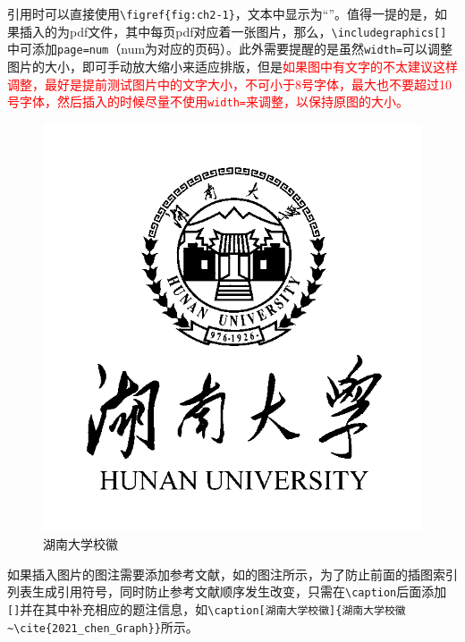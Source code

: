 引用时可以直接使用\lstinline!\figref{fig:ch2-1}!，文本中显示为“”。值得一提的是，如果插入的为pdf文件，其中每页pdf对应着一张图片，那么，\lstinline!\includegraphics[]!中可添加\lstinline!page=num!（num为对应的页码）。此外需要提醒的是虽然\lstinline!width=!可以调整图片的大小，即可手动放大缩小来适应排版，但是\textcolor{red}{如果图中有文字的不太建议这样调整，最好是提前测试图片中的文字大小，不可小于8号字体，最大也不要超过10号字体，然后插入的时候尽量不使用\lstinline!width=!来调整，以保持原图的大小。}
\begin{figure}
    \centering
    \includegraphics[]{figures/hnu-logo.png}
    \caption[湖南大学校徽]{湖南大学校徽~\cite{2021_chen_Graph}}
    \label{fig:ch2-1}
\end{figure}

如果插入图片的图注需要添加参考文献，如的图注所示，为了防止前面的插图索引列表生成引用符号，同时防止参考文献顺序发生改变，只需在\lstinline!\caption!后面添加\lstinline![]!并在其中补充相应的题注信息，如\lstinline!\caption[湖南大学校徽]{湖南大学校徽~\cite{2021_chen_Graph}}!所示。

